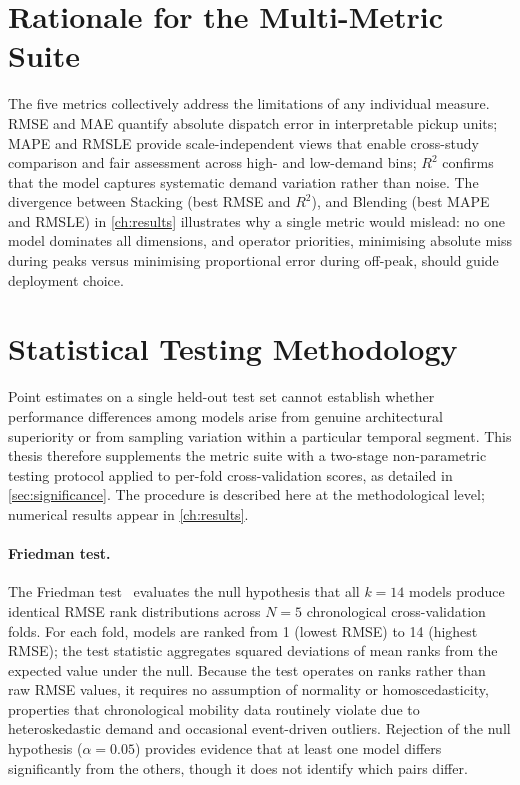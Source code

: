 \section{Rationale for the Multi-Metric Suite}

The five metrics collectively address the limitations of any individual measure. RMSE and MAE quantify absolute dispatch error in interpretable pickup units; MAPE and RMSLE provide scale-independent views that enable cross-study comparison and fair assessment across high- and low-demand bins; $R^2$ confirms that the model captures systematic demand variation rather than noise. The divergence between Stacking (best RMSE and $R^2$), and Blending (best MAPE and RMSLE) in \autoref{ch:results} illustrates why a single metric would mislead: no one model dominates all dimensions, and operator priorities, minimising absolute miss during peaks versus minimising proportional error during off-peak, should guide deployment choice.

\section{Statistical Testing Methodology}
\label{sec:metrics-significance}

Point estimates on a single held-out test set cannot establish whether performance differences among models arise from genuine architectural superiority or from sampling variation within a particular temporal segment. This thesis therefore supplements the metric suite with a two-stage non-parametric testing protocol applied to per-fold cross-validation scores, as detailed in \autoref{sec:significance}. The procedure is described here at the methodological level; numerical results appear in \autoref{ch:results}.

\paragraph{Friedman test.} The Friedman test~\parencite{scikit-learn} evaluates the null hypothesis that all $k{=}14$ models produce identical RMSE rank distributions across $N{=}5$ chronological cross-validation folds. For each fold, models are ranked from 1 (lowest RMSE) to 14 (highest RMSE); the test statistic aggregates squared deviations of mean ranks from the expected value under the null. Because the test operates on ranks rather than raw RMSE values, it requires no assumption of normality or homoscedasticity, properties that chronological mobility data routinely violate due to heteroskedastic demand and occasional event-driven outliers. Rejection of the null hypothesis ($\alpha{=}0.05$) provides evidence that at least one model differs significantly from the others, though it does not identify which pairs differ.


